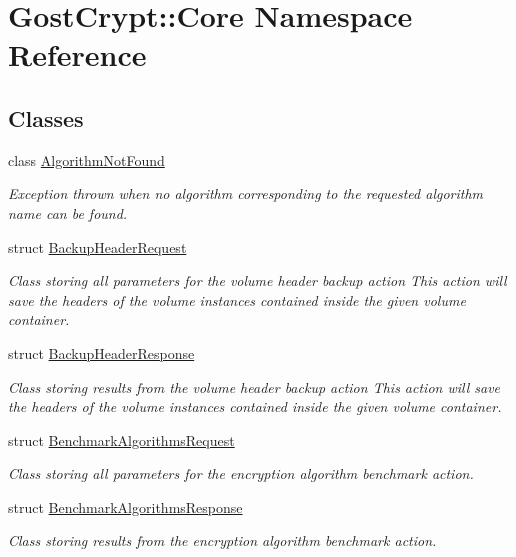 \hypertarget{namespace_gost_crypt_1_1_core}{}\section{Gost\+Crypt\+:\+:Core Namespace Reference}
\label{namespace_gost_crypt_1_1_core}
\subsection*{Classes}
\begin{DoxyCompactItemize}
\item 
class \hyperlink{class_gost_crypt_1_1_core_1_1_algorithm_not_found}{Algorithm\+Not\+Found}
\begin{DoxyCompactList}\small\item\em Exception thrown when no algorithm corresponding to the requested algorithm name can be found. \end{DoxyCompactList}\item 
struct \hyperlink{struct_gost_crypt_1_1_core_1_1_backup_header_request}{Backup\+Header\+Request}
\begin{DoxyCompactList}\small\item\em Class storing all parameters for the volume header backup action This action will save the headers of the volume instances contained inside the given volume container. \end{DoxyCompactList}\item 
struct \hyperlink{struct_gost_crypt_1_1_core_1_1_backup_header_response}{Backup\+Header\+Response}
\begin{DoxyCompactList}\small\item\em Class storing results from the volume header backup action This action will save the headers of the volume instances contained inside the given volume container. \end{DoxyCompactList}\item 
struct \hyperlink{struct_gost_crypt_1_1_core_1_1_benchmark_algorithms_request}{Benchmark\+Algorithms\+Request}
\begin{DoxyCompactList}\small\item\em Class storing all parameters for the encryption algorithm benchmark action. \end{DoxyCompactList}\item 
struct \hyperlink{struct_gost_crypt_1_1_core_1_1_benchmark_algorithms_response}{Benchmark\+Algorithms\+Response}
\begin{DoxyCompactList}\small\item\em Class storing results from the encryption algorithm benchmark action. \end{DoxyCompactList}\item 

\end{DoxyCompactItemize}
